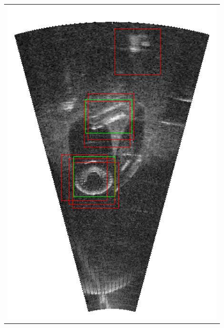 \begin{figure}[p]
{\begin{tabular}[b]{c}
		\includegraphics[height=0.22\textheight]{chapters/images/proposals/detections/nms070-2016-02-11_070611-frame04292-proposals.jpg}

\end{tabular}}
\end{figure}
